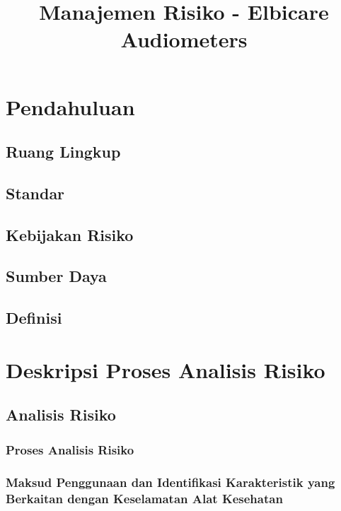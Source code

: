 \documentclass[11pt,a4paper,twoside,draft,onecolumn]{book}
\title{Manajemen Risiko - Elbicare Audiometers}
\begin{document}
	\maketitle
	\renewcommand\contentsname{Daftar Isi}
	\tableofcontents
	
	\renewcommand\listfigurename{Daftar Gambar}
	\listoffigures
	
	\renewcommand\listtablename{Daftar Tabel}
	\listoftables
	\newpage
	
	\renewcommand\chaptername{Bab}
	
	\chapter{Pendahuluan}
		\section{Ruang Lingkup}
		\section{Standar}
		\section{Kebijakan Risiko}
		\section{Sumber Daya}
		\section{Definisi}
	\newpage
	
	\chapter{Deskripsi Proses Analisis Risiko}
		\section{Analisis Risiko}
			\subsection{Proses Analisis Risiko}
			\subsection{Maksud Penggunaan dan Identifikasi Karakteristik yang Berkaitan dengan Keselamatan Alat Kesehatan}
\end{document}
